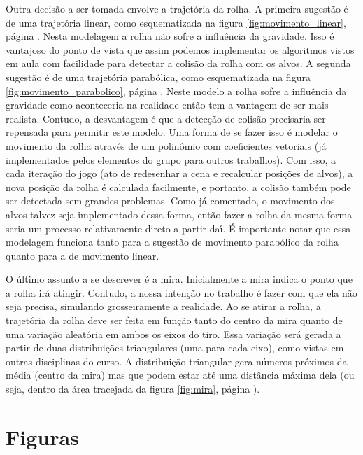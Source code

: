 \documentclass[a4paper,10pt]{article}
\begin{document}
Outra decis\~ao a ser tomada envolve a trajet\'oria da rolha. A primeira sugest\~ao \'e de uma trajet\'oria linear, como esquematizada na figura \ref{fig:movimento_linear}, p\'agina \pageref{fig:movimento_linear}. Nesta modelagem a rolha n\~ao sofre a influ\^encia da gravidade. Isso \'e vantajoso do ponto de vista que assim podemos implementar os algoritmos vistos em aula com facilidade para detectar a colis\~ao da rolha com os alvos. A segunda sugest\~ao \'e de uma trajet\'oria parab\'olica, como esquematizada na figura \ref{fig:movimento_parabolico}, p\'agina \pageref{fig:movimento_parabolico}. Neste modelo a rolha sofre a influ\^encia da gravidade como aconteceria na realidade ent\~ao tem a vantagem de ser mais realista. Contudo, a desvantagem \'e que a detec\c c\~ao de colis\~ao precisaria ser repensada para permitir este modelo. Uma forma de se fazer isso \'e modelar o movimento da rolha atrav\'es de um polin\^omio com coeficientes vetoriais (j\'a implementados pelos elementos do grupo para outros trabalhos). Com isso, a cada itera\c c\~ao do jogo (ato de redesenhar a cena e recalcular posi\c c\~oes de alvos), a nova posi\c c\~ao da rolha \'e calculada facilmente, e portanto, a colis\~ao tamb\'em pode ser detectada sem grandes problemas. Como j\'a comentado, o movimento dos alvos talvez seja implementado dessa forma, ent\~ao fazer a rolha da mesma forma seria um processo relativamente direto a partir da\'\i{}. \'E importante notar que essa modelagem funciona tanto para a sugest\~ao de movimento parab\'olico da rolha quanto para a de movimento linear.

O \'ultimo assunto a se descrever \'e a mira. Inicialmente a mira indica o ponto que a rolha ir\'a atingir. Contudo, a nossa inten\c c\~ao no trabalho \'e fazer com que ela n\~ao seja precisa, simulando grosseiramente a realidade. Ao se atirar a rolha, a trajet\'oria da rolha deve ser feita em fun\c c\~ao tanto do centro da mira quanto de uma varia\c c\~ao aleat\'oria em ambos os eixos do tiro. Essa varia\c c\~ao ser\'a gerada a partir de duas distribui\c c\~oes triangulares (uma para cada eixo), como vistas em outras disciplinas do curso. A distribui\c c\~ao triangular gera n\'umeros pr\'oximos da m\'edia (centro da mira) mas que podem estar at\'e uma dist\^ancia m\'axima dela (ou seja, dentro da \'area tracejada da figura \ref{fig:mira}, p\'agina \pageref{fig:mira}).


\section{Figuras}
\end{document}
